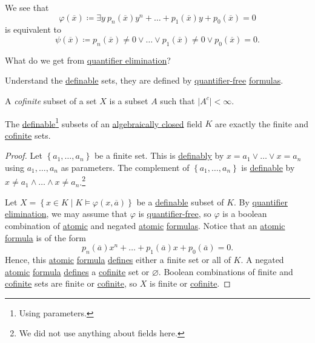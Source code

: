 \begin{remark}
	We see that
	\[
		\varphi (\overline{x} ) \coloneqq \exists y\ p_n(\overline{x} ) y^n + \ldots + p_1(\overline{x} )y + p_0(\overline{x} ) = 0
	\]
	is equivalent to
	\[
		\psi (\overline{x} ) \coloneqq p_n(\overline{x} ) \neq 0 \lor \ldots \lor p_1(\overline{x} ) \neq 0 \lor p_0(\overline{x} ) = 0.
	\]
\end{remark}

\begin{problem}
What do we get from \hyperref[def:quantifier-elimination]{quantifier elimination}?
\end{problem}
\begin{answer}
	Understand the \hyperref[def:definable]{definable} sets, they are defined by \hyperref[not:quantifier-free]{quantifier-free} \hyperref[def:formula]{formulas}.
\end{answer}

\begin{definition}[Cofinite]\label{def:cofinite}
	A \emph{cofinite} subset of a set \(X\) is a subset \(A\) such that \(\vert A^{c} \vert < \infty \).
\end{definition}

\begin{proposition}\label{prop:lec18}
	The \hyperref[def:definable]{definable}\footnote{Using parameters.} subsets of an \hyperref[def:algebraically-closed]{algebraically closed} field \(K\) are exactly the finite and \hyperref[def:cofinite]{cofinite} sets.
\end{proposition}
\begin{proof}
	Let \(\left\{ a_1, \ldots , a_n \right\} \) be a finite set. This is \hyperref[def:definable]{definably} by \(x=a_1 \lor \ldots \lor x=a_n\) using \(a_1, \ldots , a_n\) as parameters. The complement of \(\left\{ a_1, \ldots , a_n  \right\} \) is \hyperref[def:definable]{definable} by \(x \neq a_1 \land \ldots \land x\neq a_n\).\footnote{We did not use anything about fields here.}

	Let \(X=\left\{ x\in K \mid K \models \varphi (x, \overline{a} ) \right\} \) be a \hyperref[def:definable]{definable} subset of \(K\). By \hyperref[def:quantifier-elimination]{quantifier elimination}, we may assume that \(\varphi \) is \hyperref[not:quantifier-free]{quantifier-free}, so \(\varphi \) is a boolean combination of \hyperref[not:atomic]{atomic} and negated \hyperref[not:atomic]{atomic} \hyperref[def:formula]{formulas}. Notice that an \hyperref[not:atomic]{atomic} \hyperref[def:formula]{formula} is of the form
	\[
		p_n(\overline{a} ) x^n + \ldots + p_1(\overline{a} ) x + p_0(\overline{a} ) = 0.
	\]
	Hence, this \hyperref[not:atomic]{atomic} \hyperref[def:formula]{formula} \hyperref[def:definable]{defines} either a finite set or all of \(K\). A negated \hyperref[not:atomic]{atomic} \hyperref[def:formula]{formula} \hyperref[def:definable]{defines} a \hyperref[def:cofinite]{cofinite} set or \(\varnothing \). Boolean combinations of finite and \hyperref[def:cofinite]{cofinite} sets are finite or \hyperref[def:cofinite]{cofinite}, so \(X\) is finite or \hyperref[def:cofinite]{cofinite}.
\end{proof}

